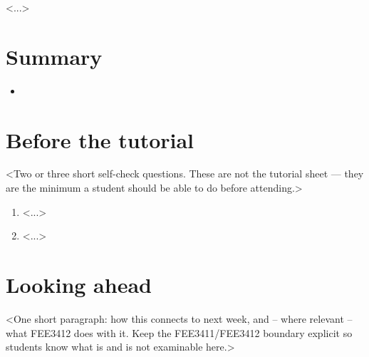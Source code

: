 \documentclass[11pt,a4paper]{article}
\begin{document}
<...>

\section*{Summary}

\begin{itemize}
\item <one line per key result>
\end{itemize}

\section*{Before the tutorial}

<Two or three short self-check questions. These are not the tutorial sheet ---
they are the minimum a student should be able to do before attending.>

\begin{enumerate}
\item <...>
\item <...>
\end{enumerate}

\section*{Looking ahead}

<One short paragraph: how this connects to next week, and -- where relevant --
what FEE3412 does with it. Keep the FEE3411/FEE3412 boundary explicit so
students know what is and is not examinable here.>
\end{document}
